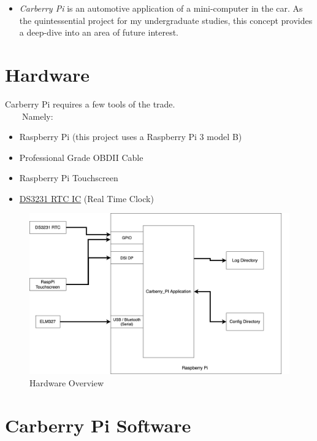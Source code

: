 \documentclass{article}
\providecommand{\tightlist}{%
  \setlength{\itemsep}{0pt}\setlength{\parskip}{0pt}}
\numberwithin{figure}{section}
\begin{document}
\begin{itemize}
\tightlist
\item
  \emph{Carberry Pi} is an automotive application of a mini-computer in
  the car. As the quintessential project for my undergraduate studies,
  this concept provides a deep-dive into an area of future interest.
\end{itemize}

\hypertarget{hardware}{%
\section{Hardware}\label{hardware}}

Carberry Pi requires a few tools of the trade.\\

~~~~Namely:

\begin{itemize}
\item
  Raspberry Pi (this project uses a Raspberry Pi 3 model B)
\item
  Professional Grade OBDII Cable
\item
  Raspberry Pi Touchscreen
\item
 \href{https://thepihut.com/products/mini-rtc-module-for-raspberry-pi}{DS3231 RTC IC}
  (Real Time Clock)
\end{itemize}

\begin{figure}[H]
\centering
\includegraphics[width=1\columnwidth]{./diagrams/architecture/architecture_diagram.png}
\caption{Hardware Overview}
\end{figure}

\hypertarget{carberry-pi-software}{%
\section{Carberry Pi Software}\label{carberry-pi-software}}
\end{document}
